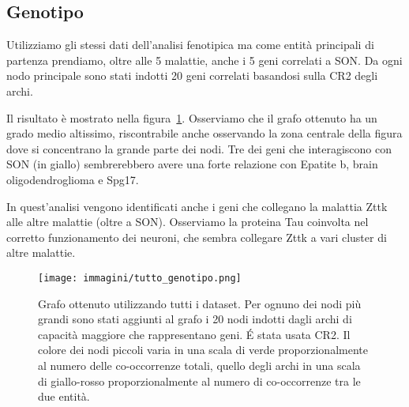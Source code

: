 \documentclass[12pt]{report}
\begin{document}
\newpage
\subsection{Genotipo}

Utilizziamo gli stessi dati dell'analisi fenotipica ma come entità principali di partenza prendiamo, oltre alle 5 malattie, anche i 5 geni correlati a SON. Da ogni nodo principale sono stati indotti 20 geni correlati basandosi sulla CR2 degli archi. 

Il risultato è mostrato nella figura~\ref{fig:tutto_genotipo}.
Osserviamo che il grafo ottenuto ha un grado medio altissimo, riscontrabile anche osservando la zona centrale della figura dove si concentrano la grande parte dei nodi. Tre dei geni che interagiscono con SON (in giallo) sembrerebbero avere una forte relazione con Epatite b, brain oligodendroglioma e Spg17.

In quest'analisi vengono identificati anche i geni che collegano la malattia Zttk alle altre malattie (oltre a SON). Osserviamo la proteina Tau coinvolta nel corretto funzionamento dei neuroni, che sembra collegare Zttk a vari cluster di altre malattie. 

\begin{figure}[!htb]
\centering
\texttt{[image: immagini/tutto\_genotipo.png]}
\caption{\footnotesize{Grafo ottenuto utilizzando tutti i dataset. Per ognuno dei nodi più grandi sono stati aggiunti al grafo i 20 nodi indotti dagli archi di capacità maggiore che rappresentano geni. \'E stata usata CR2. Il colore dei nodi piccoli varia in una scala di verde proporzionalmente al numero delle co-occorrenze totali, quello degli archi in una scala di giallo-rosso proporzionalmente al numero di co-occorrenze tra le due entità.}}
\label{fig:tutto_genotipo}
\end{figure}
\end{document}
